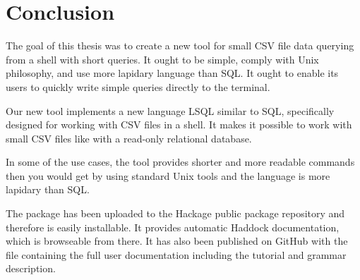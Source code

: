 \chapter*{Conclusion}

The goal of this thesis was to create a new tool for small CSV file data querying from a shell with short queries.
It ought to be simple, comply with Unix philosophy, and use more lapidary language than SQL.
It ought to enable its users to quickly write simple queries directly to the terminal.

Our new tool  implements a new language LSQL similar to
SQL, specifically designed for working with CSV files in a shell. It makes it possible to work with small CSV files like with a read-only relational database.

In some of the use cases, the tool provides shorter and more readable commands then you would get by using standard Unix tools and the 
language is more lapidary than SQL.

The  package has been uploaded to the Hackage public package repository and therefore is easily installable. 
It provides automatic Haddock documentation, which is browseable from there. 
It has also been published on GitHub with the  file containing the full user documentation including the tutorial and grammar description.

